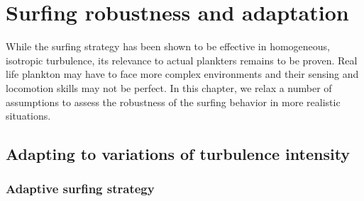 \chapter{Surfing robustness and adaptation}\label{chap:surfing_robustness}

While the surfing strategy has been shown to be effective in homogeneous, isotropic turbulence, its relevance to actual plankters remains to be proven.
Real life plankton may have to face more complex environments and their sensing and locomotion skills may not be perfect.
In this chapter, we relax a number of assumptions to assess the robustness of the surfing behavior in more realistic situations.

\section{Adapting to variations of turbulence intensity}\label{sec:adaptive_strategy}

\subsection{Adaptive surfing strategy}\label{sec:adaptive_strategy_subsec}

